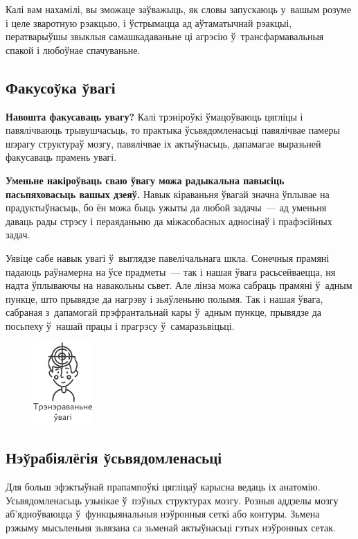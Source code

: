 Калі вам нахамілі, вы зможаце заўважыць, як словы запускаюць у~вашым розуме і целе зваротную рэакцыю, і ўстрымацца ад аўтаматычнай рэакцыі, ператварыўшы звыклыя самашкадаваньне ці агрэсію ў~трансфармавальныя спакой і любоўнае спачуваньне.


\subsection*{Факусоўка ўвагі}

\textbf{Навошта факусаваць увагу?} Калі трэніроўкі ўмацоўваюць цягліцы і павялічваюць трывушчасьць, то практыка ўсьвядомленасьці павялічвае памеры шэрагу структураў мозгу, павялічвае іх актыўнасьць, дапамагае выразьней факусаваць прамень увагі.

\textbf{Уменьне накіроўваць сваю ўвагу можа радыкальна павысіць пасьпяховасьць вашых дзеяў.} Навык кіраваньня ўвагай значна ўплывае на прадуктыўнасьць, бо ён можа быць ужыты да любой задачы~--- ад уменьня даваць рады стрэсу і пераяданьню да міжасобасных адносінаў і прафэсійных задач.

Уявіце сабе навык увагі ў~выглядзе павелічальнага шкла. Сонечныя прамяні падаюць раўнамерна на ўсе прадметы~--- так і нашая ўвага расьсейваецца, ня надта ўплываючы на навакольны сьвет. Але лінза можа сабраць прамяні ў~адным пункце, што прывядзе да нагрэву і зьяўленьню полымя. Так і нашая ўвага, сабраная з~дапамогай прэфрантальнай кары ў~адным пункце, прывядзе да посьпеху ў~нашай працы і прагрэсу ў~самаразьвіцьці.

\begin{figure}[htb!]
  \centering
  \includegraphics[scale=1.5]{willpower/ch8/3.pdf}
\end{figure}

\subsection*{Нэўрабіялёгія ўсьвядомленасьці}

Для больш эфэктыўнай прапампоўкі цягліцаў карысна ведаць іх анатомію. Усьвядомленасьць узьнікае ў~пэўных структурах мозгу. Розныя аддзелы мозгу аб'ядноўваюцца ў~функцыянальныя нэўронныя сеткі або контуры. Зьмена рэжыму мысьленьня зьвязана са зьменай актыўнасьці гэтых нэўронных сетак.

